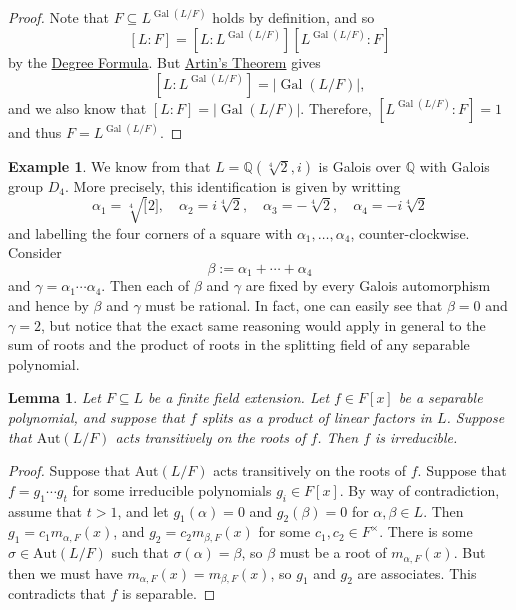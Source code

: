 \documentclass[12pt]{report}
\newtheorem{lemma}[theorem]{Lemma}
\numberwithin{equation}{section}
\numberwithin{theorem}{chapter}
\theoremstyle{definition}
\newtheorem{example}[theorem]{Example}
\newtheorem*{basic properties}{Basic Properties}
\newtheorem*{Important Remark}{Important Remark}
\DeclareMathOperator{\Gal}{Gal}
\begin{document}
\begin{proof} 
Note that $F \subseteq L^{\Gal(L/F)}$ holds by definition, and so 
$$[L:F] = [L: L^{\Gal(L/F)}][L^{\Gal(L/F)} : F]$$ 
by the \hyperref[deg formula]{Degree Formula}. But \hyperref[Artin's theorem]{Artin's Theorem} gives
$$[L: L^{\Gal(L/F)}] = |\Gal(L/F)|,$$ 
and we also know that $[L:F] = |\Gal(L/F)|$. Therefore, $[L^{\Gal(L/F)}:F] = 1$ and thus $F = L^{\Gal(L/F)}$.
\end{proof}


\begin{example} 
We know from  that $L = \mathbb{Q}(\sqrt[4]{2}, i)$ is Galois over $\mathbb{Q}$ with Galois group $D_4$. More precisely, this identification is given by writting 
$$\alpha_1 = \sqrt[4][2], \quad \alpha_2 = i\sqrt[4]{2}, \quad \alpha_3 = -\sqrt[4]{2}, \quad \alpha_4 = -i\sqrt[4]{2}$$ 
and labelling the four corners of a square with $\alpha_1, \ldots, \alpha_4$, counter-clockwise.  Consider 
$$\beta := \alpha_1 + \cdots + \alpha_4$$ 
and $\gamma = \alpha_1 \cdots \alpha_4$. Then each of $\beta$ and $\gamma$ are fixed by every Galois automorphism and hence by  $\beta$ and $\gamma$ must be rational. In fact, one can easily see that $\beta = 0$ and $\gamma = 2$, but notice that the exact same reasoning would apply in general to the sum of roots and the product of roots in the splitting field of any separable polynomial.
\end{example}


\begin{lemma} Let $F\subseteq L$ be a finite field extension. Let $f\in F[x]$ be a separable polynomial, and suppose that $f$ splits as a product of linear factors in $L$. Suppose that $\mathrm{Aut}(L/F)$ acts transitively on the roots of $f$. Then $f$ is irreducible.
\end{lemma}
\begin{proof} Suppose that $\mathrm{Aut}(L/F)$ acts transitively on the roots of $f$. Suppose that $f=g_1 \cdots g_t$ for some irreducible polynomials $g_i\in F[x]$. By way of contradiction, assume that $t>1$, and let $g_1(\alpha)=0$ and $g_2(\beta)=0$ for $\alpha,\beta\in L$. Then $g_1 = c_1 m_{\alpha,F}(x)$, and $g_2=c_2 m_{\beta,F}(x)$ for some $c_1,c_2\in F^\times$. There is some $\sigma\in \mathrm{Aut}(L/F)$ such that $\sigma(\alpha)=\beta$, so $\beta$ must be a root of $m_{\alpha,F}(x)$. But then we must have $m_{\alpha,F}(x)=m_{\beta,F}(x)$, so $g_1$ and $g_2$ are associates. This contradicts that $f$ is separable.
\end{proof}
\end{document}
